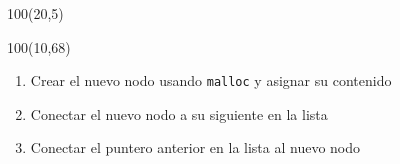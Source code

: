 \documentclass[aspectratio=169]{beamer}
\begin{document}
\begin{frame}[t]
     \begin{textblock}{100}(20,5)  \end{textblock} %
     
    \begin{textblock}{100}(10,68)
    \begin{enumerate}[A]
    \item Crear el nuevo nodo usando \texttt{malloc} y asignar su contenido
    \item Conectar el nuevo nodo a su siguiente en la lista
    \item Conectar el puntero anterior en la lista al nuevo nodo
    \end{enumerate}
    \end{textblock}
\end{frame}
\end{document}
